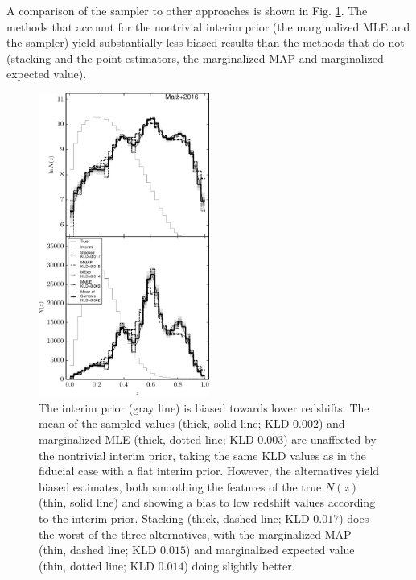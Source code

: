 \documentclass[preprint]{aastex}
\begin{document}
A comparison of the sampler to other approaches is shown in Fig. 
\ref{fig:intu-comp}.  The methods that account for the nontrivial interim prior 
(the marginalized MLE and the sampler) yield substantially less biased results 
than the methods that do not (stacking and the point estimators, the 
marginalized MAP and marginalized expected value).


\begin{figure}
\includegraphics[width=0.5\textwidth]{figs/uint/comps.pdf}
\caption{The interim prior (gray line) is biased towards lower redshifts.  The 
mean of the sampled values (thick, solid line; KLD $0.002$) and marginalized 
MLE (thick, dotted line; KLD $0.003$) are unaffected by the nontrivial interim 
prior, taking the same KLD values as in the fiducial case with a flat interim 
prior.  However, the alternatives yield biased estimates, both smoothing the 
features of the true $N(z)$ (thin, solid line) and showing a bias to low 
redshift values according to the interim prior.  Stacking (thick, dashed line; 
KLD $0.017$) does the worst of the three alternatives, with the marginalized 
MAP (thin, dashed line; KLD $0.015$) and marginalized expected value (thin, 
dotted line; KLD $0.014$) doing slightly better.}
\label{fig:intu-comp}
\end{figure}
\end{document}

